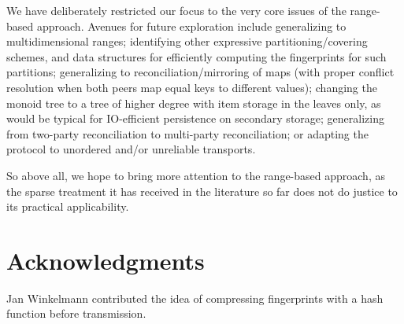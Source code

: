 \documentclass[conference]{IEEEtran}
\begin{document}
We have deliberately restricted our focus to the very core issues of the range-based approach. Avenues for future exploration include generalizing to multidimensional ranges; identifying other expressive partitioning/covering schemes, and data structures for efficiently computing the fingerprints for such partitions; generalizing to reconciliation/mirroring of maps (with proper conflict resolution when both peers map equal keys to different values); changing the monoid tree to a tree of higher degree with item storage in the leaves only, as would be typical for IO-efficient persistence on secondary storage;  generalizing from two-party reconciliation to multi-party reconciliation; or adapting the protocol to unordered and/or unreliable transports.



So above all, we hope to bring more attention to the range-based approach, as the sparse treatment it has received in the literature so far does not do justice to its practical applicability.

\section{Acknowledgments}

Jan Winkelmann contributed the idea of compressing fingerprints with a hash function before transmission.



% 
% 
\end{document}
